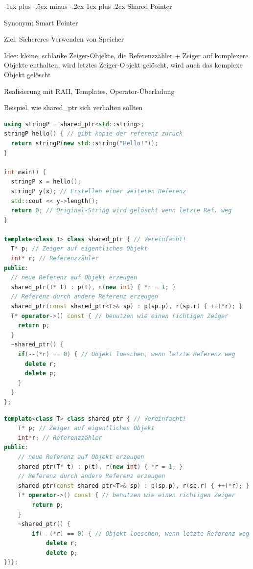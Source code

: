 \documentclass[10pt]{article}
\makeatletter
\renewcommand{\subsubsection}{\@startsection{subsubsection}{3}{0mm}%
                                {-1ex plus -.5ex minus -.2ex}%
                                {1ex plus .2ex}%
                                {\normalfont\small\bfseries}}
\makeatother
\begin{document}
\subsubsection{Shared Pointer}
\begin{itemize*}
  \item Synonym: Smart Pointer
  \item Ziel: Sichereres Verwenden von Speicher
  \item Idee: kleine, schlanke Zeiger-Objekte, die Referenzzähler + Zeiger auf komplexere Objekte enthalten, wird letztes Zeiger-Objekt gelöscht, wird auch das komplexe Objekt gelöscht
  \item Realisierung mit RAII, Templates, Operator-Überladung
  \item Beispiel, wie shared\_ptr sich verhalten sollten
\end{itemize*}
\begin{lstlisting}[language=C++]
using stringP = shared_ptr<std::string>;
stringP hello() { // gibt kopie der referenz zurück
  return stringP(new std::string("Hello!"));
}

int main() {
  stringP x = hello();
  stringP y(x); // Erstellen einer weiteren Referenz
  std::cout << y->length();
  return 0; // Original-String wird gelöscht wenn letzte Ref. weg
}

template<class T> class shared_ptr { // Vereinfacht!
  T* p; // Zeiger auf eigentliches Objekt
  int* r; // Referenzzähler
public:
  // neue Referenz auf Objekt erzeugen
  shared_ptr(T* t) : p(t), r(new int) { *r = 1; }
  // Referenz durch andere Referenz erzeugen
  shared_ptr(const shared_ptr<T>& sp) : p(sp.p), r(sp.r) { ++(*r); }
  T* operator->() const { // benutzen wie einen richtigen Zeiger
    return p;
  }
  ~shared_ptr() {
    if(--(*r) == 0) { // Objekt loeschen, wenn letzte Referenz weg
      delete r;
      delete p;
    }
  }
};
\end{lstlisting}

\begin{lstlisting}[language=C++]
template<class T> class shared_ptr { // Vereinfacht!
    T* p; // Zeiger auf eigentliches Objekt
    int*r; // Referenzzähler
public:
    // neue Referenz auf Objekt erzeugen
    shared_ptr(T* t) : p(t), r(new int) { *r = 1; }
    // Referenz durch andere Referenz erzeugen
    shared_ptr(const shared_ptr<T>& sp) : p(sp.p), r(sp.r) { ++(*r); }
    T* operator->() const { // benutzen wie einen richtigen Zeiger
        return p;
    }
    ~shared_ptr() {
        if(--(*r) == 0) { // Objekt loeschen, wenn letzte Referenz weg
            delete r;
            delete p;
}}};
\end{lstlisting}
\end{document}

